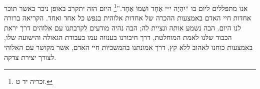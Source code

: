 \documentclass[12pt, extrafontsizes, twopage, a5paper]{memoir}
\begin{document}
אנו מתפללים ליום בו ``יִהְיֶה י״י אֶחָד וּשְׁמוֹ אֶחָד.''\footnote{זכריה יד ט.} היום הזה יתקרב באופן ניכר כאשר תוכר אחדות חיי האדם באמצעות ההכרה של אחדות אלוהית בנפש כל אחד ואחד. הקריאה ברורה לנו היום. הבה נשמע אותה ונציית לה; הבה נהיה מודעים לקרבתנו עם אלוהים דרך יראת הכבוד שלנו לאמת המוחלטת, דרך חיבורנו בענווה עמו בעבודת הגאולה והישועה שלו, באמצעות כוחנו לאהוב ללא קץ, דרך אמונתנו בהמשכיות חיי האדם, אשר מקושר עם האלוהי לצורך יצירת צדקה.
\end{document}
